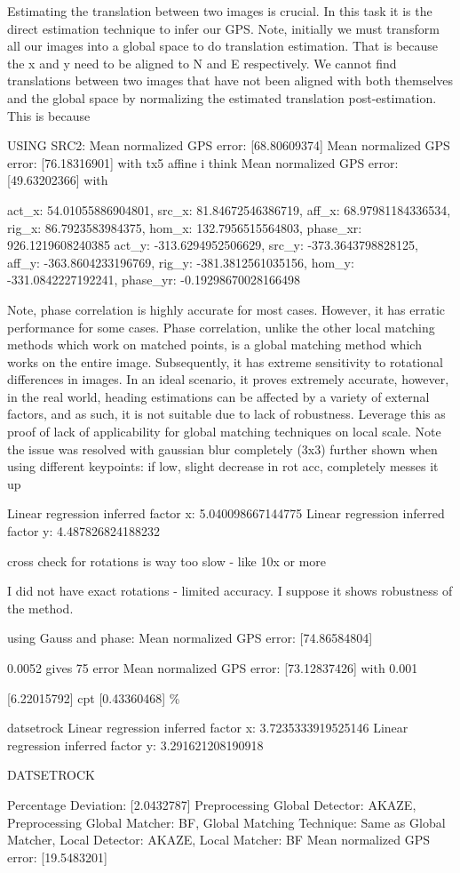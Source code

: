 Estimating the translation between two images is crucial. In this task it is the direct estimation technique to infer our GPS. Note, initially we must transform all our images into a global space to do translation estimation. That is because the x and y need to be aligned to N and E respectively. We cannot find translations between two images that have not been aligned with both themselves and the global space by normalizing the estimated translation post-estimation. This is because 

USING SRC2: Mean normalized GPS error: [68.80609374]
Mean normalized GPS error: [76.18316901]  with tx5 affine i think
Mean normalized GPS error: [49.63202366] with 


act_x: 54.01055886904801, src_x: 81.84672546386719, aff_x: 68.97981184336534, rig_x: 86.7923583984375, hom_x: 132.7956515564803, phase_xr: 926.1219608240385
act_y: -313.6294952506629, src_y: -373.3643798828125, aff_y: -363.8604233196769, rig_y: -381.3812561035156, hom_y: -331.0842227192241, phase_yr: -0.19298670028166498

Note, phase correlation is highly accurate for most cases. However, it has erratic performance for some cases. Phase correlation, unlike the other local matching methods which work on matched points, is a global matching method which works on the entire image. Subsequently, it has extreme sensitivity to rotational differences in images. In an ideal scenario, it proves extremely accurate, however, in the real world, heading estimations can be affected by a variety of external factors, and as such, it is not suitable due to lack of robustness.
Leverage this as proof of lack of applicability for global matching techniques on local scale. 
Note the issue was resolved with gaussian blur completely (3x3)
further shown when using different keypoints: if low, slight decrease in rot acc, completely messes it up

Linear regression inferred factor x: 5.040098667144775
Linear regression inferred factor y: 4.487826824188232








cross check for rotations is way too slow - like 10x or more
    
I did not have exact rotations - limited accuracy. I suppose it shows robustness of the method.


using Gauss and phase: Mean normalized GPS error: [74.86584804]


0.0052 gives 75 error 
Mean normalized GPS error: [73.12837426] with 0.001


[6.22015792] cpt [0.43360468] \%


datsetrock
Linear regression inferred factor x: 3.7235333919525146
Linear regression inferred factor y: 3.291621208190918


DATSETROCK

Percentage Deviation: [2.0432787] %
Preprocessing Global Detector: AKAZE, Preprocessing Global Matcher: BF, Global Matching Technique: Same as Global Matcher, Local Detector: AKAZE, Local Matcher: BF
Mean normalized GPS error: [19.5483201]